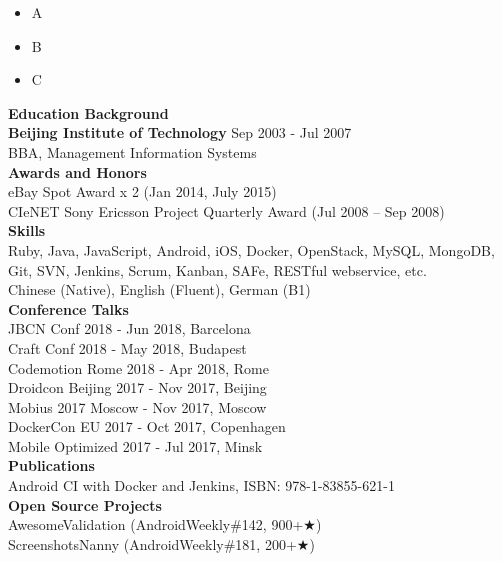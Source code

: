 \documentclass[12pt, a4paper]{article}
\begin{document}
\begin{itemize}
  \setlength\itemsep{0em}
  \item A
  \item B
  \item C
\end{itemize}

\textcolor{highlightblue}{\textbf{\huge Education Background}} \\

\textbf{Beijing Institute of Technology} \hfill Sep 2003 - Jul 2007 \\

BBA, Management Information Systems \\

\textcolor{highlightblue}{\textbf{\huge Awards and Honors}} \\

eBay Spot Award x 2 (Jan 2014, July 2015) \\

CIeNET Sony Ericsson Project Quarterly Award (Jul 2008 – Sep 2008) \\

\textcolor{highlightblue}{\textbf{\huge Skills}} \\

Ruby, Java, JavaScript, Android, iOS, Docker, OpenStack, MySQL, MongoDB, Git, SVN, Jenkins, Scrum, Kanban, SAFe, RESTful webservice, etc. \\

Chinese (Native), English (Fluent), German (B1) \\

\textcolor{highlightblue}{\textbf{\huge Conference Talks}} \\

JBCN Conf 2018 - Jun 2018, Barcelona \\

Craft Conf 2018 - May 2018, Budapest \\

Codemotion Rome 2018 - Apr 2018, Rome \\

Droidcon Beijing 2017 - Nov 2017, Beijing \\

Mobius 2017 Moscow - Nov 2017, Moscow \\

DockerCon EU 2017 - Oct 2017, Copenhagen \\

Mobile Optimized 2017 - Jul 2017, Minsk \\

\textcolor{highlightblue}{\textbf{\huge Publications}} \\

Android CI with Docker and Jenkins, ISBN: 978-1-83855-621-1 \\

\textcolor{highlightblue}{\textbf{\huge Open Source Projects}} \\

AwesomeValidation (AndroidWeekly\#142, 900+{\DejaVuSans ★}) \\

ScreenshotsNanny (AndroidWeekly\#181, 200+{\DejaVuSans ★}) \\
\end{document}
